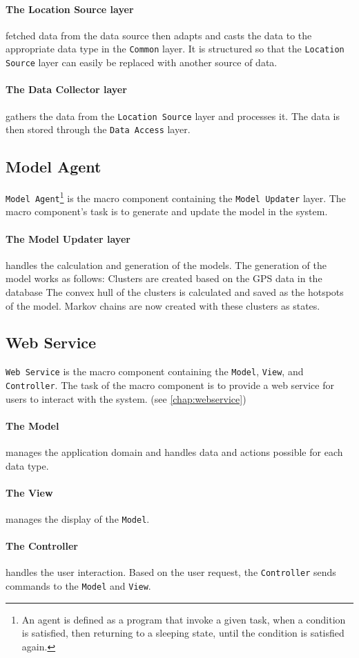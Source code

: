\paragraph{The Location Source layer} fetched data from the data source then adapts and casts the data to the appropriate data type in the \texttt{Common} layer.
It is structured so that the \texttt{Location Source} layer can easily be replaced with another source of data.

\paragraph{The Data Collector layer} gathers the data from the \texttt{Location Source} layer and processes it. 
The data is then stored through the \texttt{Data Access} layer.


\subsection{Model Agent}
\texttt{Model Agent}\footnote{An agent is defined as a program that invoke a given task, when a condition is satisfied, then returning to a sleeping state, until the condition is satisfied again.\cite{definitionagent}} is the macro component containing the \texttt{Model Updater} layer.
The macro component's task is to generate and update the model in the system. 

\paragraph{The Model Updater layer} handles the calculation and generation of the models.
The generation of the model works as follows:
Clusters are created based on the GPS data in the database
The convex hull of the clusters is calculated and saved as the hotspots of the model.
Markov chains are now created with these clusters as states.

\subsection{Web Service}\label{arch:webservice}
\texttt{Web Service} is the macro component containing the \texttt{Model}, \texttt{View}, and \texttt{Controller}.
The task of the macro component is to provide a web service for users to interact with the system. (see \cref{chap:webservice})

\paragraph{The Model} manages the application domain and handles data and actions possible for each data type.

\paragraph{The View} manages the display of the \texttt{Model}.

\paragraph{The Controller} handles the user interaction. Based on the user request, the \texttt{Controller} sends commands to the \texttt{Model} and \texttt{View}.